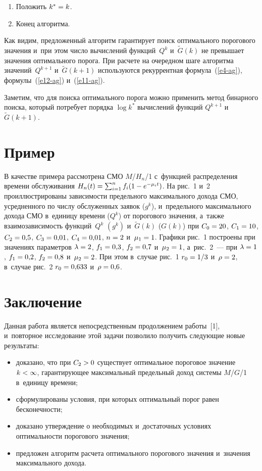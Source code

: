 \begin{multicols}{2}
\begin{enumerate}[1.]
\item Положить $k^*\hm=k$.\\[-14pt]
\item Конец алгоритма.\\[-14pt]
\end{enumerate}
  
  Как видим, предложенный алгоритм гарантирует поиск оптимального 
порогового значения и~при этом число вычислений функций~$Q^k$ 
и~$\tilde{G}(k)$ не превышает значения оптимального порога. При расчете на 
очередном шаге алгоритма значений~$Q^{k+1}$ и~$\tilde{G}(k+1)$ 
используются рекуррентная формула~(\ref{e4-ag}), формулы~(\ref{e12-ag}) 
и~(\ref{e11-ag}).
  
  Заметим, что для поиска оптимального порога можно применить метод 
бинарного поиска, который потребует порядка $\log k^*$ вычислений функций 
$Q^{k+1}$ и~$\tilde{G}(k+1)$.
  
\section{Пример}

  В качестве примера рассмотрена СМО $M$/$H_n$/1 с~функцией 
распределения времени обслуживания $H_n(t)\hm= \sum\nolimits_{i=1}^n 
f_i(1\hm-e^{-\mu_it})$. На рис.~1 и~2 проиллюстрированы 
зависимости предельного максимального дохода СМО, усредненного по чис\-лу 
обслуженных заявок ($g^k$), и~предельного максимального дохода СМО 
в~единицу времени ($Q^k$) от порогового значения, а~также 
взаимозависимость функций~$Q^k$ $(g^k)$ и~$\tilde{G}(k)$ ($G(k)$)
при $C_0\hm= 
20$, $C_1\hm=10$, $C_2\hm= 0{,}5$, $C_3\hm= 0{,}01$, $C_4\hm= 0{,}01$,
$n\hm=2$ и~$\mu_1\hm=1$.
Графики рис.~1 построены при значениях параметров 
$\lambda \hm=2$, $f_1\hm=0{,}3$, $f_2\hm= 0{,}7$ 
и~$\mu_2\hm=1$, а~рис.~2~---
 при $\lambda\hm=1$, $f_1\hm=0{,}2$, $f_2\hm=0{,}8$ 
 и~$\mu_2\hm=2$. При этом в~случае рис.~1 $r_0\hm= 1/3$
и~$\rho\hm=2$, в~случае рис.~2 $r_0\hm=0{,}633$ и~$\rho\hm=0{,}6$.
  
\section{Заключение}

  Данная работа является непосредственным продолжением работы~[1], 
и~повторное исследование этой задачи позволило получить следующие новые 
результаты: 
  \begin{itemize}
\item доказано, что при $C_2\hm>0$ существует оптимальное пороговое 
значение $k\hm<\infty$, гарантиру\-ющее максимальный предельный доход 
сис\-те\-мы $M$/$G$/1 в~единицу времени;
\item сформулированы условия, при которых оптимальный порог равен 
бесконечности;
\item доказано утверждение о необходимых и~достаточных условиях 
оптимальности порогового значения; 
\item предложен алгоритм расчета оптимального порогового значения 
и~значения максимального дохода. 
\end{itemize}


\end{multicols}
